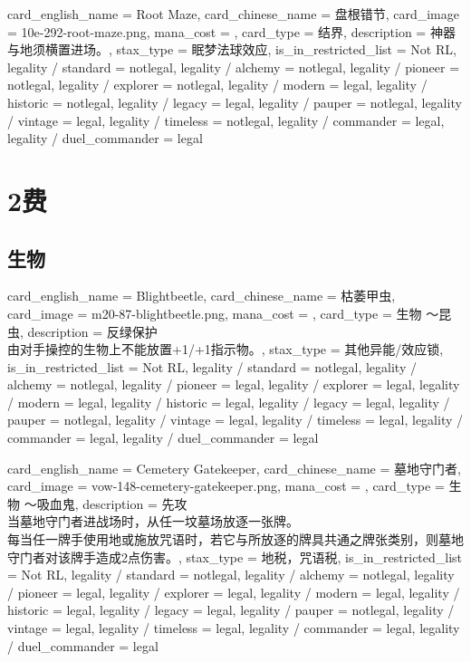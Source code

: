 \documentclass[lang = cn, color = black, 10pt]{AllThatStax}
\begin{document}
\card
{
	card_english_name = {Root Maze},
	card_chinese_name = {盘根错节},
	card_image = 10e-292-root-maze.png,
	mana_cost = ,
	card_type = 结界,
	description = {神器与地须横置进场。},
	stax_type = 眠梦法球效应,
	is_in_restricted_list = Not RL,
	legality / standard = notlegal,
	legality / alchemy = notlegal,
	legality / pioneer = notlegal,
	legality / explorer = notlegal,
	legality / modern = legal,
	legality / historic = notlegal,
	legality / legacy = legal,
	legality / pauper = notlegal,
	legality / vintage = legal,
	legality / timeless = notlegal,
	legality / commander = legal,
	legality / duel_commander = legal
}

\chapter{2费}

\section{生物}

\card
{
	card_english_name = {Blightbeetle},
	card_chinese_name = {枯萎甲虫},
	card_image = m20-87-blightbeetle.png,
	mana_cost = ,
	card_type = 生物 ～昆虫,
	description = {反绿保护\\
		由对手操控的生物上不能放置+1/+1指示物。},
	stax_type = 其他异能/效应锁,
	is_in_restricted_list = Not RL,
	legality / standard = notlegal,
	legality / alchemy = notlegal,
	legality / pioneer = legal,
	legality / explorer = legal,
	legality / modern = legal,
	legality / historic = legal,
	legality / legacy = legal,
	legality / pauper = notlegal,
	legality / vintage = legal,
	legality / timeless = legal,
	legality / commander = legal,
	legality / duel_commander = legal
}

\card
{
	card_english_name = {Cemetery Gatekeeper},
	card_chinese_name = {墓地守门者},
	card_image = vow-148-cemetery-gatekeeper.png,
	mana_cost = ,
	card_type = 生物 ～吸血鬼,
	description = {先攻\\
		当墓地守门者进战场时，从任一坟墓场放逐一张牌。\\
		每当任一牌手使用地或施放咒语时，若它与所放逐的牌具共通之牌张类别，则墓地守门者对该牌手造成2点伤害。},
	stax_type = 地税，咒语税,
	is_in_restricted_list = Not RL,
	legality / standard = notlegal,
	legality / alchemy = notlegal,
	legality / pioneer = legal,
	legality / explorer = legal,
	legality / modern = legal,
	legality / historic = legal,
	legality / legacy = legal,
	legality / pauper = notlegal,
	legality / vintage = legal,
	legality / timeless = legal,
	legality / commander = legal,
	legality / duel_commander = legal
}
\end{document}
